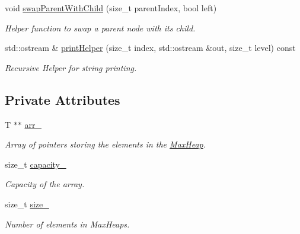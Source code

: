\begin{DoxyCompactItemize}
void \hyperlink{class_max_heap_a06a4eaee6d86a0e332b38ed1f382c969}{swap\+Parent\+With\+Child} (size\+\_\+t parent\+Index, bool left)
\begin{DoxyCompactList}\small\item\em Helper function to swap a parent node with its child. \end{DoxyCompactList}\item 
std\+::ostream \& \hyperlink{class_max_heap_acb7f5834d10b183fd9e38992f563ba86}{print\+Helper} (size\+\_\+t index, std\+::ostream \&out, size\+\_\+t level) const
\begin{DoxyCompactList}\small\item\em Recursive Helper for string printing. \end{DoxyCompactList}\end{DoxyCompactItemize}
\subsection*{Private Attributes}
\begin{DoxyCompactItemize}
\item 
\mbox{\label{class_max_heap_a790bbf28c9bbb52d6536b29e9104abf1}} 
T $\ast$$\ast$ \hyperlink{class_max_heap_a790bbf28c9bbb52d6536b29e9104abf1}{arr\+\_\+}
\begin{DoxyCompactList}\small\item\em Array of pointers storing the elements in the \hyperlink{class_max_heap}{Max\+Heap}. \end{DoxyCompactList}\item 
\mbox{\label{class_max_heap_a0c0c7743a2aea092ec5b5fef184f8449}} 
size\+\_\+t \hyperlink{class_max_heap_a0c0c7743a2aea092ec5b5fef184f8449}{capacity\+\_\+}
\begin{DoxyCompactList}\small\item\em Capacity of the array. \end{DoxyCompactList}\item 
\mbox{\label{class_max_heap_ab3d7d763f6dd0fd197145f9c2b4704fa}} 
size\+\_\+t \hyperlink{class_max_heap_ab3d7d763f6dd0fd197145f9c2b4704fa}{size\+\_\+}
\begin{DoxyCompactList}\small\item\em Number of elements in Max\+Heaps. \end{DoxyCompactList}\end{DoxyCompactItemize}
